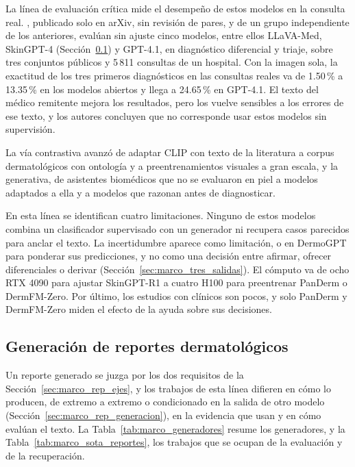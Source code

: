 La línea de evaluación crítica mide el desempeño de estos modelos en la consulta real.
\textcite{jiang2026multimodal}, publicado solo en arXiv, sin revisión de pares, y de un grupo independiente de los
anteriores, evalúan sin ajuste cinco modelos, entre ellos LLaVA-Med, SkinGPT-4
(Sección~\ref{sec:estado_arte_reportes}) y GPT-4.1, en diagnóstico
diferencial y triaje, sobre tres conjuntos públicos y 5\,811 consultas de un hospital. Con la imagen sola, la
exactitud de los tres primeros diagnósticos en las consultas reales va de 1.50\,\% a 13.35\,\% en los modelos
abiertos y llega a 24.65\,\% en GPT-4.1. El texto del médico remitente mejora los resultados, pero los vuelve
sensibles a los errores de ese texto, y los autores concluyen que no corresponde usar estos modelos sin
supervisión.

La vía contrastiva avanzó de adaptar CLIP con texto de la literatura a corpus dermatológicos con ontología y a
preentrenamientos visuales a gran escala, y la generativa, de asistentes biomédicos que no se evaluaron en piel a
modelos adaptados a ella y a modelos que razonan antes de diagnosticar.

En esta línea se identifican cuatro
limitaciones. Ninguno de estos modelos combina un clasificador supervisado con un generador ni recupera casos parecidos para
anclar el texto. La incertidumbre aparece como limitación, o en DermoGPT para ponderar sus predicciones, y no como
una decisión entre afirmar, ofrecer diferenciales o derivar (Sección~\ref{sec:marco_tres_salidas}). El cómputo va
de ocho RTX 4090 para ajustar SkinGPT-R1 a cuatro H100 para preentrenar PanDerm o DermFM-Zero. Por último, los
estudios con clínicos son pocos, y solo PanDerm y DermFM-Zero miden el efecto de la ayuda sobre sus decisiones.

\FloatBarrier
\subsection{Generación de reportes dermatológicos}
\label{sec:estado_arte_reportes}

Un reporte generado se juzga por los dos requisitos de la Sección~\ref{sec:marco_rep_ejes}, y los trabajos de esta
línea difieren en cómo lo producen, de extremo a extremo o condicionado en la salida de otro modelo
(Sección~\ref{sec:marco_rep_generacion}), en la evidencia que usan y en cómo evalúan el texto. La
Tabla~\ref{tab:marco_generadores} resume los generadores, y la Tabla~\ref{tab:marco_sota_reportes}, los trabajos
que se ocupan de la evaluación y de la recuperación.

